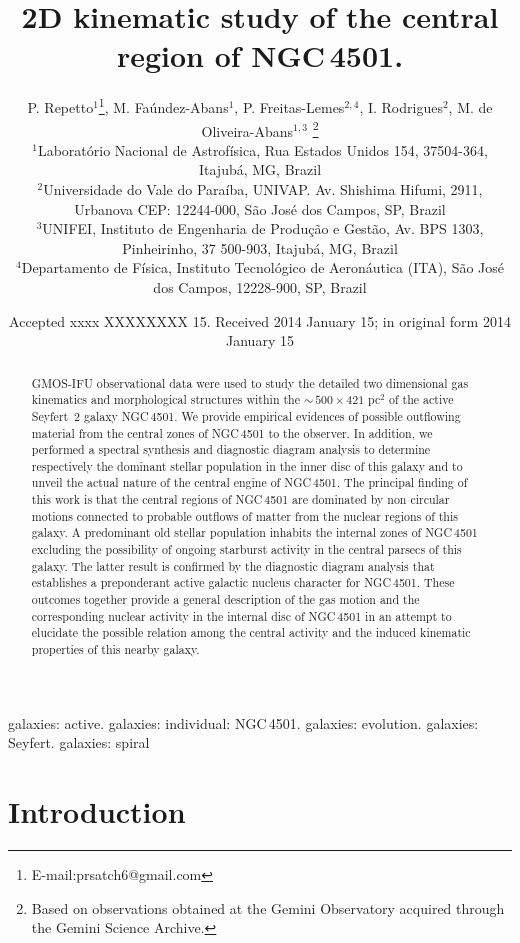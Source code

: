 \documentclass[fleqn,usenatbib]{mnras}
\title[2D kinematic of the central region of NGC\,4501.]{2D kinematic study of the central region of NGC\,4501.}
\author[P. Repetto et al.]{P. Repetto$^{1}$\thanks{E-mail:prsatch6@gmail.com}, 
M. Fa\'{u}ndez-Abans$^{1}$, P. Freitas-Lemes$^{2, 4}$, I. Rodrigues$^{2}$, \newauthor M. de Oliveira-Abans$^{1,3}$
\thanks{Based on observations obtained at the Gemini Observatory acquired through the Gemini Science Archive.}\\
$^{1}$Laborat\'{o}rio Nacional de Astrof\'{i}sica, Rua Estados Unidos 154, 37504-364, Itajub\'{a}, MG, Brazil\\
$^{2}$Universidade do Vale do Para\'{i}ba, UNIVAP. Av. Shishima Hifumi, 2911, Urbanova CEP: 12244-000, S\~{a}o Jos\'{e} dos Campos, SP, Brazil\\
$^{3}$UNIFEI, Instituto de Engenharia de Produ\c{c}\~{a}o e Gest\~{a}o, Av. BPS 1303, Pinheirinho, 37 500-903, Itajub\'{a}, MG, Brazil\\
$^{4}$Departamento de Física, Instituto Tecnológico de Aeronáutica (ITA), São José dos Campos, 12228-900, SP, Brazil}
\begin{document}
\label{firstpage}
\date{Accepted xxxx XXXXXXXX 15. Received 2014 January 15; in original form 2014 January 15}
\maketitle

\begin{abstract}
GMOS-IFU observational data were used to study the detailed two dimensional gas kinematics and morphological structures within the $\sim\,500 \times 421$ pc$^2$ of the
active \mbox{Seyfert 2} galaxy NGC\,4501. We provide empirical evidences of possible outflowing material from the central zones of NGC\,4501 to the observer. In addition,  
we performed a spectral synthesis and diagnostic diagram analysis to determine respectively the dominant stellar population in the inner disc of this galaxy and to unveil
the actual nature of the central engine of NGC\,4501. The principal finding of this work is that the central regions of NGC\,4501 are dominated by non circular motions 
connected to probable outflows of matter from the nuclear regions of this galaxy. A predominant old stellar population inhabits the internal zones of NGC\,4501 excluding
the possibility of ongoing starburst activity in the central parsecs of this galaxy. The latter result is confirmed by the diagnostic diagram analysis that establishes a
preponderant active galactic nucleus character for NGC\,4501. These outcomes together provide a general description of the gas motion and the 
corresponding nuclear activity in the internal disc of NGC\,4501 in an attempt to elucidate the possible relation among the central activity and the induced kinematic 
properties of this nearby galaxy.
\end{abstract}

\begin{keywords}
galaxies: active.  galaxies: individual: NGC\,4501. galaxies: evolution. galaxies: Seyfert. galaxies: spiral
\end{keywords}

\section{Introduction}\label{sec:s1}
\end{document}

